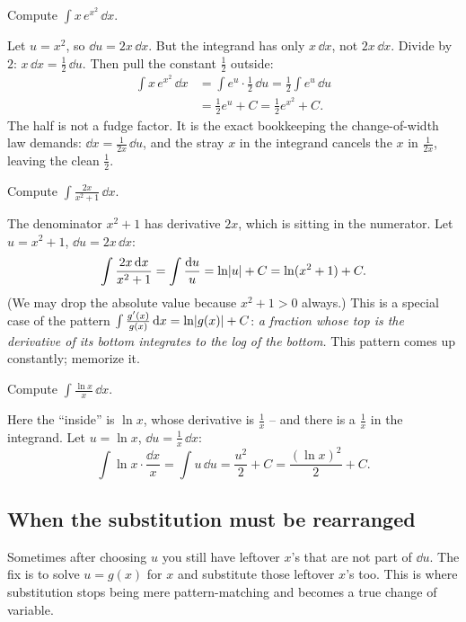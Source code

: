 \begin{example}
\label{ch22:ex-constant}
Compute $\displaystyle \int x\,e^{x^2}\,\dd x$.

Let $u = x^2$, so $\dd u = 2x\,\dd x$. But the integrand has only $x\,\dd x$, not
$2x\,\dd x$. Divide by $2$: $x\,\dd x = \tfrac12\,\dd u$. Then pull the
constant $\tfrac12$ outside:
\begin{align*}
  \int x\,e^{x^2}\,\dd x &= \int e^{u}\cdot \tfrac12\,\dd u
   = \tfrac12\int e^{u}\,\dd u\\
  &= \tfrac12 e^{u} + C = \tfrac12 e^{x^2} + C.
\end{align*}
The half is not a fudge factor. It is the exact bookkeeping the change-of-width law
demands: $\dd x = \tfrac{1}{2x}\,\dd u$, and the stray $x$ in the integrand cancels
the $x$ in $\tfrac{1}{2x}$, leaving the clean $\tfrac12$.
\end{example}

\begin{example}
\label{ch22:ex-log}
Compute $\displaystyle \int \frac{2x}{x^2+1}\,\dd x$.

The denominator $x^2+1$ has derivative $2x$, which is sitting in the numerator. Let
$u = x^2+1$, $\dd u = 2x\,\dd x$:
\[
  \int \frac{2x\,\mathrm{d} x}{x^2+1} = \int \frac{\mathrm{d} u}{u} = \ln\lvert u\rvert + C
   = \ln(x^2+1) + C.
\]
(We may drop the absolute value because $x^2+1 > 0$ always.) This is a special case
of the pattern $\int \frac{g'(x)}{g(x)}\,\mathrm{d} x = \ln\lvert g(x)\rvert +
C$: \emph{a fraction whose top is the derivative of its bottom integrates to the log
of the bottom.} This pattern comes up constantly; memorize it.
\end{example}

\begin{example}
\label{ch22:ex-lnx}
Compute $\displaystyle \int \frac{\ln x}{x}\,\dd x$.

Here the ``inside'' is $\ln x$, whose derivative is $\tfrac1x$ -- and there is a
$\tfrac1x$ in the integrand. Let $u = \ln x$, $\dd u = \tfrac1x\,\dd x$:
\[
  \int \ln x\cdot\frac{\dd x}{x} = \int u\,\dd u = \frac{u^2}{2}+C
   = \frac{(\ln x)^2}{2} + C.
\]
\end{example}

\subsection{When the substitution must be rearranged}

Sometimes after choosing $u$ you still have leftover $x$'s that are not part of
$\dd u$. The fix is to solve $u = g(x)$ for $x$ and substitute those leftover
$x$'s too. This is where substitution stops being mere pattern-matching and becomes
a true change of variable.

